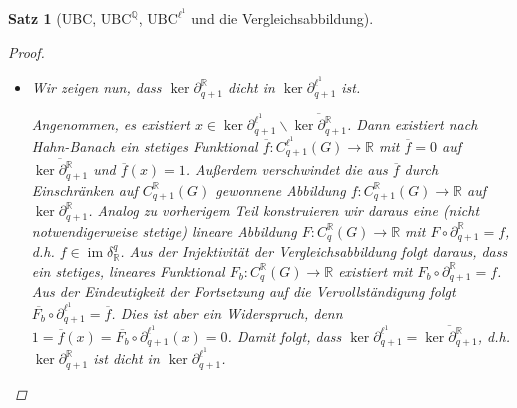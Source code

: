 \documentclass[a4paper,twoside,10pt]{scrreprt}
\DeclareMathOperator{\img}{im}
\newcommand{\UBC}{\text{UBC}}
\newcommand{\Q}{\mathbb{Q}}
\newcommand{\R}{\mathbb{R}}
\newtheorem{satz}{Satz}[section]
\theoremstyle{definition}
\begin{document}
\begin{satz}[UBC, $\UBC^{\Q}$, $\UBC^{\ell^1}$ und die Vergleichsabbildung]
\begin{proof}
\begin{itemize}
Wir setzen diese zu einer linearen Abbildung $F:C_q^{\R}(G)\to \R$ fort.
Dann gilt $F\circ \partial_{q+1}^{\R}=f$, d.h. $f\in \img \delta_{\R}^q$. Aus der Injektivität der Vergleichsabbildung folgt somit, dass $f\in \img \delta_{\R,b}^q$, also ist $\img \partial_{q+1}^{\ell^1}$ abgeschlossen.\par
Daraus folgt aus dem Prinzip der offenen Abbildung, dass $\overline{\partial_{q+1}^{\ell^1}}:\frac{C_{q+1}^{\ell^1}(G)}{\ker \partial_{q+1}^{\ell^1}}\to \img \partial_{q+1}^{\ell^1}$ ein Isomorphismus (hier im Sinne stetiger, linearer Abbildungen) ist. Es sei $\|\cdot\|_{\text{quot}}$ die Quotientennorm auf $\frac{C_{q+1}^{\ell^1}(G)}{\ker \partial_{q+1}^{\ell^1}}$. Dann existiert damit ein $K>0$, sodass für alle $z\in \img \partial_{q+1}^{\ell^1}$ ein $c\in C_{q+1}^{\ell^1}(G)$ existiert mit $\partial_{q+1}^{\R}(c)=z$, $2\|[c]\|_{\text{quot}}\leq K\|z\|_1$ und $\|c\|_1\leq 2\|[c]\|_{\text{quot}}$, womit $q$-$\text{UBC}^{\ell^1}$ erfüllt ist.\par
\item Wir zeigen nun, dass $\ker \partial_{q+1}^{\R}$ dicht in $\ker \partial_{q+1}^{\ell^1}$ ist.\par
Angenommen, es existiert $x\in \ker \partial_{q+1}^{\ell^1}\backslash\overline{\ker \partial_{q+1}^{\R}}$. Dann existiert nach Hahn-Banach ein stetiges Funktional $\overline{f}:C_{q+1}^{\ell^1}(G)\to \R$ mit $\overline{f}=0$ auf $\overline{\ker \partial_{q+1}^{\R}}$ und $\overline{f}(x)=1$. Außerdem verschwindet die aus $\overline{f}$ durch Einschränken auf $C_{q+1}^{\R}(G)$ gewonnene Abbildung $f:C_{q+1}^{\R}(G)\to \R$ auf $\ker \partial_{q+1}^{\R}$. Analog zu vorherigem Teil konstruieren wir daraus eine (nicht notwendigerweise stetige) lineare Abbildung $F:C_q^{\R}(G)\to \R$ mit $F\circ \partial_{q+1}^{\R}=f$, d.h. $f\in \img \delta_{\R}^q$. Aus der Injektivität der Vergleichsabbildung folgt daraus, dass ein stetiges, lineares Funktional $F_b:C_q^{\R}(G)\to \R$ existiert mit $F_b\circ \partial_{q+1}^{\R}=f$. Aus der Eindeutigkeit der Fortsetzung auf die Vervollständigung folgt $\overline{F_b}\circ \partial_{q+1}^{\ell^1}=\overline{f}$. Dies ist aber ein Widerspruch, denn $1=\overline{f}(x)=\overline{F_b}\circ \partial_{q+1}^{\ell^1}(x)=0$. Damit folgt, dass $\ker \partial_{q+1}^{\ell^1}=\overline{\ker \partial_{q+1}^{\R}}$, d.h. $\ker \partial_{q+1}^{\R}$ ist dicht in $\ker \partial_{q+1}^{\ell^1}$.
\end{itemize}
\end{proof}
\end{satz}
\end{document}
